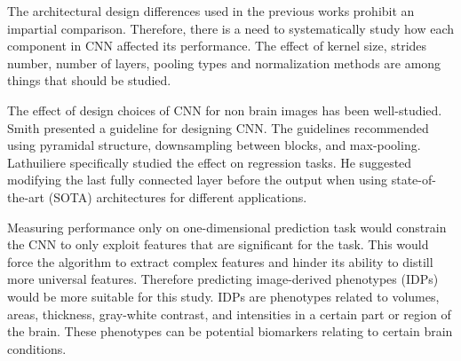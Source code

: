 \documentclass{article}
\begin{document}
    The architectural design differences used in the previous works prohibit an impartial comparison. 
    Therefore, there is a need to systematically study how each component in CNN affected its performance. 
    The effect of kernel size, strides number, number of layers, pooling types and normalization methods are among things that should be studied.
    
    The effect of design choices of CNN for non brain images has been well-studied. 
    Smith\cite{smith} presented a guideline for designing CNN. 
    The guidelines recommended using pyramidal structure, downsampling between blocks, and max-pooling. 
    Lathuiliere\cite{lath} specifically studied the effect on regression tasks. 
    He suggested modifying the last fully connected layer before the output when using state-of-the-art (SOTA) architectures for different applications.

    Measuring performance only on one-dimensional prediction task would constrain the CNN to only exploit features that are significant for the task. 
    This would force the algorithm to extract complex features and hinder its ability to distill more universal features. 
    Therefore predicting image-derived phenotypes (IDPs) would be more suitable for this study. 
    IDPs are phenotypes related to volumes, areas, thickness, gray-white contrast, and intensities in a certain part or region of the brain. 
    These phenotypes can be potential biomarkers relating to certain brain conditions. 
\end{document}
